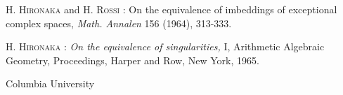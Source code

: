 \begin{thebibliography}{99}
 \textsc{H. Hironaka} and \textsc{H. Rossi :} On the equivalence of imbeddings of exceptional complex spaces, {\em Math. Annalen} 156 (1964), 313-333.

 \textsc{H. Hironaka :} {\em On the equivalence of singularities,} I, Arithmetic Algebraic Geometry, Proceedings, Harper and Row, New York, 1965.
\end{thebibliography}

\bigskip
\noindent
Columbia University
